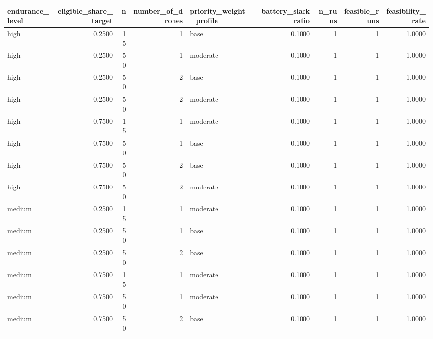 \begin{tabular}{lrrrlrrrr}
\toprule
endurance_level & eligible_share_target & n & number_of_drones & priority_weight_profile & battery_slack_ratio & n_runs & feasible_runs & feasibility_rate \\
\midrule
high & 0.2500 & 15 & 1 & base & 0.1000 & 1 & 1 & 1.0000 \\
high & 0.2500 & 50 & 1 & moderate & 0.1000 & 1 & 1 & 1.0000 \\
high & 0.2500 & 50 & 2 & base & 0.1000 & 1 & 1 & 1.0000 \\
high & 0.2500 & 50 & 2 & moderate & 0.1000 & 1 & 1 & 1.0000 \\
high & 0.7500 & 15 & 1 & moderate & 0.1000 & 1 & 1 & 1.0000 \\
high & 0.7500 & 50 & 1 & base & 0.1000 & 1 & 1 & 1.0000 \\
high & 0.7500 & 50 & 2 & base & 0.1000 & 1 & 1 & 1.0000 \\
high & 0.7500 & 50 & 2 & moderate & 0.1000 & 1 & 1 & 1.0000 \\
medium & 0.2500 & 15 & 1 & moderate & 0.1000 & 1 & 1 & 1.0000 \\
medium & 0.2500 & 50 & 1 & base & 0.1000 & 1 & 1 & 1.0000 \\
medium & 0.2500 & 50 & 2 & base & 0.1000 & 1 & 1 & 1.0000 \\
medium & 0.7500 & 15 & 1 & moderate & 0.1000 & 1 & 1 & 1.0000 \\
medium & 0.7500 & 50 & 1 & moderate & 0.1000 & 1 & 1 & 1.0000 \\
medium & 0.7500 & 50 & 2 & base & 0.1000 & 1 & 1 & 1.0000 \\
\bottomrule
\end{tabular}
